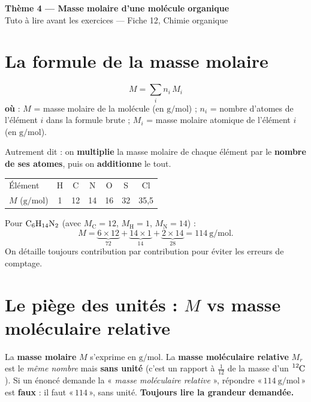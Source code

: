 \documentclass[11pt,a4paper]{article}
\newcommand{\banner}[2]{%
\begin{tcolorbox}[enhanced,colback=primary,colframe=primary,arc=5pt,boxrule=0pt,
   left=5mm,right=5mm,top=2.5mm,bottom=2.5mm,coltext=white]
{\large\bfseries #1}\\[1pt]{\small #2}
\end{tcolorbox}\vspace{1pt}}
\begin{document}
\banner{Thème 4 — Masse molaire d'une molécule organique}{%
Tuto à lire avant les exercices — Fiche 12, Chimie organique}

\section{La formule de la masse molaire}
\begin{formule}
\[ \boxed{\,M = \sum_i n_i\,M_i\,} \]
\textbf{où} : $M$ = masse molaire de la molécule (en $\si{\g\per\mol}$) ; $n_i$ = nombre d'atomes de l'élément $i$ dans la formule brute ; $M_i$ = masse molaire atomique de l'élément $i$ (en $\si{\g\per\mol}$).
\end{formule}
Autrement dit : on \textbf{multiplie} la masse molaire de chaque élément par le \textbf{nombre de ses atomes}, puis on \textbf{additionne} le tout.

\begin{center}\small\renewcommand{\arraystretch}{1.05}
\begin{tabular}{lcccccc}
\toprule
Élément & H & C & N & O & S & Cl \\
$M$ ($\si{\g\per\mol}$) & 1 & 12 & 14 & 16 & 32 & 35,5 \\
\bottomrule
\end{tabular}
\end{center}

\begin{exmp}
Pour $\ce{C6H14N2}$ (avec $M_\text{C}=12$, $M_\text{H}=1$, $M_\text{N}=14$) :
\[ M = \underbrace{6\times12}_{72} + \underbrace{14\times1}_{14} + \underbrace{2\times14}_{28} = \qty{114}{\g\per\mol}. \]
On détaille toujours contribution par contribution pour éviter les erreurs de comptage.
\end{exmp}

\section{Le piège des unités : $M$ vs masse moléculaire relative}
\begin{piege}
La \textbf{masse molaire} $M$ s'exprime en $\si{\g\per\mol}$. La \textbf{masse moléculaire relative} $M_r$ est le \emph{même nombre} mais \textbf{sans unité} (c'est un rapport à $\tfrac{1}{12}$ de la masse d'un $\ce{^{12}C}$). Si un énoncé demande la « \emph{masse moléculaire relative} », répondre «\,$114\ \si{\g\per\mol}$\,» est \textbf{faux} : il faut «\,$114$\,», sans unité. \textbf{Toujours lire la grandeur demandée.}
\end{piege}
\end{document}
